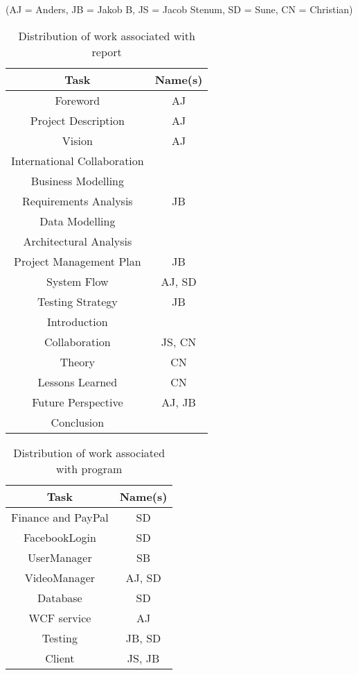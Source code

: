 \label{Distribution of Work}
(AJ = Anders, JB = Jakob B, JS = Jacob Stenum, SD = Sune, CN = Christian)\\
\begin{table}[H]
\caption{Distribution of work associated with report}
\centering

\begin{tabular}{c c}
Task & Name(s) \\ [1.5ex] 
\hline
Foreword & AJ \\
Project Description & AJ \\
Vision & AJ\\
International Collaboration & \\
Business Modelling & \\
Requirements Analysis & JB\\
Data Modelling & \\
Architectural Analysis & \\
Project Management Plan & JB \\
System Flow & AJ, SD\\
Testing Strategy & JB\\
Introduction & \\
Collaboration & JS, CN \\
Theory & CN \\
Lessons Learned & CN\\
Future Perspective & AJ, JB \\
Conclusion & \\

\end{tabular}
\end{table}
\newpage
\begin{table}[H]
\caption{Distribution of work associated with program}
\centering
\begin{tabular}{c c}
Task & Name(s)\\ [1.5ex] 
\hline
Finance and PayPal & SD \\
FacebookLogin & SD \\
UserManager & SB \\
VideoManager & AJ, SD \\
Database & SD \\
WCF service & AJ\\
Testing & JB, SD \\
Client & JS, JB\\


\end{tabular}
\end{table}

